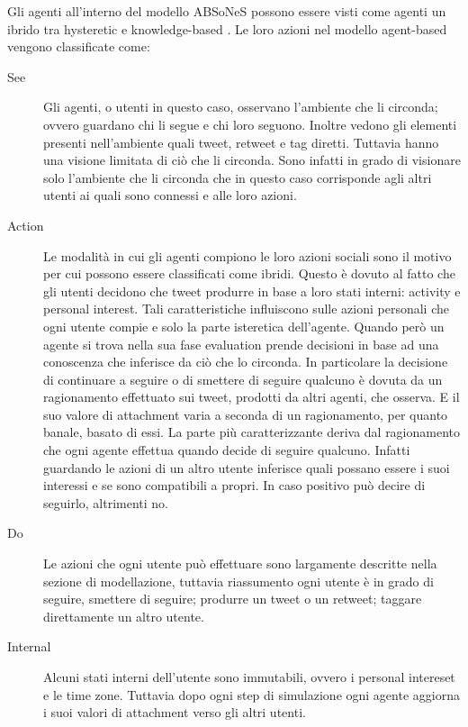 \documentclass[a4paper,12pt]{article}
\begin{document}
Gli agenti all'interno del modello ABSoNeS possono essere visti come agenti un ibrido tra hysteretic e knowledge-based \cite{ferber}. Le loro azioni nel modello agent-based vengono classificate come:
\begin{description}
    \item[See] Gli agenti, o utenti in questo caso,
    osservano l'ambiente che li circonda; ovvero guardano chi li segue e chi loro seguono. Inoltre vedono gli elementi presenti nell'ambiente quali tweet, retweet e tag diretti. Tuttavia hanno una visione limitata di ci\`o che li circonda. Sono infatti in grado di visionare solo l'ambiente che li circonda che in questo caso corrisponde agli altri utenti ai quali sono connessi e alle loro azioni.
    \item[Action] Le modalit\`a in cui gli agenti compiono le loro azioni sociali sono il motivo per cui possono essere classificati come ibridi.
    Questo \`e dovuto al fatto che gli utenti decidono che tweet produrre in base a loro stati interni: activity e personal interest. Tali caratteristiche influiscono sulle azioni personali che ogni utente compie e solo la parte isteretica dell'agente.
    Quando per\`o un agente si trova nella sua fase evaluation prende decisioni in base ad una conoscenza che inferisce da ci\`o che lo circonda. 
    In particolare la decisione di continuare a seguire o di smettere di seguire qualcuno \`e dovuta da un ragionamento effettuato sui tweet, prodotti da altri agenti, che osserva. E il suo valore di attachment varia a seconda di un ragionamento, per quanto banale, basato di essi.
    La parte pi\`u caratterizzante deriva dal ragionamento che ogni agente effettua quando decide di seguire qualcuno. Infatti guardando le azioni di un altro utente inferisce quali possano essere i suoi interessi e se sono compatibili a propri. In caso positivo pu\`o decire di seguirlo, altrimenti no.
    \item[Do] Le azioni che ogni utente pu\`o effettuare sono largamente descritte nella sezione di modellazione, tuttavia riassumento ogni utente \`e in grado di seguire, smettere di seguire; produrre un tweet o un retweet; taggare direttamente un altro utente.
    \item[Internal] Alcuni stati interni dell'utente sono immutabili, ovvero i personal intereset e le time zone. Tuttavia dopo ogni step di simulazione ogni agente aggiorna i suoi valori di attachment verso gli altri utenti.
\end{description}
\end{document}
